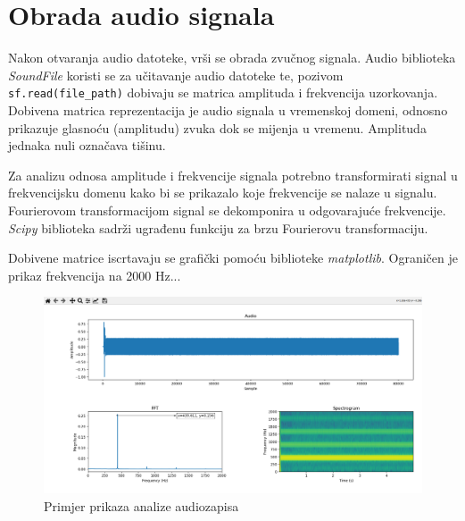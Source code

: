 \chapter{Obrada audio signala}

Nakon otvaranja audio datoteke, vrši se obrada zvučnog signala. Audio biblioteka \textit{SoundFile} koristi se za učitavanje audio datoteke te, pozivom \lstinline|sf.read(file_path)| dobivaju se matrica amplituda i frekvencija uzorkovanja. Dobivena matrica reprezentacija je audio signala u vremenskoj domeni, odnosno prikazuje glasnoću (amplitudu) zvuka dok se mijenja u vremenu. Amplituda jednaka nuli označava tišinu.

Za analizu odnosa amplitude i frekvencije signala potrebno transformirati signal u frekvencijsku domenu kako bi se prikazalo koje frekvencije se nalaze u signalu. Fourierovom transformacijom signal se dekomponira u odgovarajuće frekvencije. \textit{Scipy} biblioteka sadrži ugrađenu funkciju za brzu Fourierovu transformaciju.

Dobivene matrice iscrtavaju se grafički pomoću biblioteke \textit{matplotlib}. Ograničen je prikaz frekvencija na 2000 Hz...


\begin{figure}[ht]
	\includegraphics[width=\linewidth]{imgs/analyse_example}
	\caption{Primjer prikaza analize audiozapisa}
	\label{fig:analyse_example}
\end{figure}
